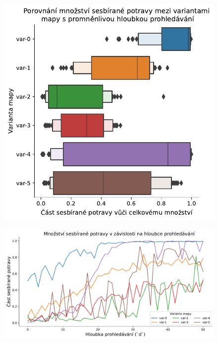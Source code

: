 \documentclass[10pt,a4paper,twocolumn]{article}
\begin{document}
\begin{figure}[tb]
  \centering
  \includegraphics[width=0.98\linewidth]{images/search_depth_variants_means.pdf}
  \caption{}
  \label{fig:search_depth_means}
\end{figure}

\begin{figure}[tb]
  \centering
  \includegraphics[width=0.98\linewidth]{images/search_depth_variants_together.pdf}
  \caption{}
  \label{fig:search_depth_together}
\end{figure}
\end{document}

